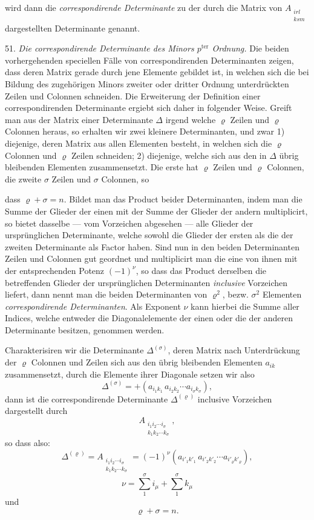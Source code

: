 \documentclass[11pt]{article}
\providecommand{\weberpage}[1]{}
\let\Delta\varDelta
\begin{document}
wird dann die \textit{correspondirende Determinante} zu der durch die Matrix von
$A_{\substack{irl\\ksm}}$ dargestellten Determinante genannt.

51. \textit{Die correspondirende Determinante des Minors $p^{\text{ter}}$ Ordnung.} Die beiden
vorhergehenden speciellen F\"alle von correspondirenden Determinanten zeigen, dass deren Matrix
gerade durch jene Elemente gebildet ist, in welchen sich die bei Bildung des zugeh\"origen Minors
zweiter oder dritter Ordnung unterdr\"uckten Zeilen und Colonnen schneiden. Die Erweiterung der
Definition einer correspondirenden Determinante ergiebt sich daher in folgender Weise. Greift man
aus der Matrix einer Determinante $\varDelta$ irgend welche $\varrho$ Zeilen und $\varrho$
Colonnen heraus, so erhalten wir zwei kleinere Determinanten, und zwar 1) diejenige, deren Matrix
aus allen Elementen besteht, in welchen sich die $\varrho$ Colonnen und $\varrho$ Zeilen
schneiden; 2) diejenige, welche sich aus den in $\varDelta$ \"ubrig bleibenden Elementen
zusammensetzt. Die erste hat $\varrho$ Zeilen und $\varrho$ Colonnen, die zweite $\sigma$ Zeilen
und $\sigma$ Colonnen, so


\weberpage{57}
dass $\varrho + \sigma = n$. Bildet man das Product beider Determinanten, indem man die Summe der Glieder der einen mit der Summe der Glieder der andern multiplicirt, so bietet dasselbe --- vom Vorzeichen abgesehen --- alle Glieder der ursprünglichen Determinante, welche sowohl die Glieder der ersten als die der zweiten Determinante als Factor haben. Sind nun in den beiden Determinanten Zeilen und Colonnen gut geordnet und multiplicirt man die eine von ihnen mit der entsprechenden Potenz $(-1)^{\nu}$, so dass das Product derselben die betreffenden Glieder der ursprünglichen Determinanten \textit{inclusive} Vorzeichen liefert, dann nennt man die beiden Determinanten von $\varrho^2$, bezw. $\sigma^2$ Elementen \textit{correspondirende Determinanten}. Als Exponent $\nu$ kann hierbei die Summe aller Indices, welche entweder die Diagonalelemente der einen oder die der anderen Determinante besitzen, genommen werden.

Charakterisiren wir die Determinante $\Delta^{(\sigma)}$, deren Matrix nach Unterdrückung der $\varrho$ Colonnen und Zeilen sich aus den übrig bleibenden Elementen $a_{ik}$ zusammensetzt, durch die Elemente ihrer Diagonale setzen wir also
\[
\Delta^{(\sigma)} = + (a_{i_1 k_1}\, a_{i_2 k_2} \cdots a_{i_\sigma k_\sigma}),
\]
dann ist die correspondirende Determinante $\Delta^{(\varrho)}$ inclusive Vorzeichen dargestellt durch
\[
A_{\substack{i_1 i_2 \cdots i_\sigma \\ k_1 k_2 \cdots k_\sigma}},
\]
so dass also:
\[
\Delta^{(\varrho)} = A_{\substack{i_1 i_2 \cdots i_\sigma \\ k_1 k_2 \cdots k_\sigma}} = (-1)^{\nu} (a_{i'_1 k'_1}\, a_{i'_2 k'_2} \cdots a_{i'_\varrho k'_\varrho}),
\]
\[
\nu = \sum_1^\sigma i_\mu + \sum_1^\sigma k_\mu
\]
und
\[
\varrho + \sigma = n.
\]
\end{document}
